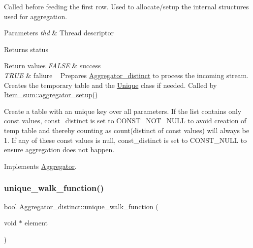 Called before feeding the first row. Used to allocate/setup the internal structures used for aggregation.


\begin{DoxyParams}{Parameters}
{\em thd} & Thread descriptor \\
\hline
\end{DoxyParams}
\begin{DoxyReturn}{Returns}
status 
\end{DoxyReturn}

\begin{DoxyRetVals}{Return values}
{\em F\+A\+L\+SE} & success \\
\hline
{\em T\+R\+UE} & faliure ~\newline
 Prepares \mbox{\hyperlink{classAggregator__distinct}{Aggregator\+\_\+distinct}} to process the incoming stream. Creates the temporary table and the \mbox{\hyperlink{classUnique}{Unique}} class if needed. Called by \mbox{\hyperlink{classItem__sum_ac84fa680a8b3690c6735474c9476f312}{Item\+\_\+sum\+::aggregator\+\_\+setup()}} \\
\hline
\end{DoxyRetVals}
Create a table with an unique key over all parameters. If the list contains only const values, const\+\_\+distinct is set to C\+O\+N\+S\+T\+\_\+\+N\+O\+T\+\_\+\+N\+U\+LL to avoid creation of temp table and thereby counting as count(distinct of const values) will always be 1. If any of these const values is null, const\+\_\+distinct is set to C\+O\+N\+S\+T\+\_\+\+N\+U\+LL to ensure aggregation does not happen.

Implements \mbox{\hyperlink{classAggregator_afcde359558a43054f7812a72498a263f}{Aggregator}}.

\mbox{\label{classAggregator__distinct_abc8b41d0e322a1d475f69e7008818dfc}} 
\subsubsection{\texorpdfstring{unique\+\_\+walk\+\_\+function()}{unique\_walk\_function()}}
{\footnotesize\ttfamily bool Aggregator\+\_\+distinct\+::unique\+\_\+walk\+\_\+function (\begin{DoxyParamCaption}\item[{void $\ast$}]{element }\end{DoxyParamCaption})}


